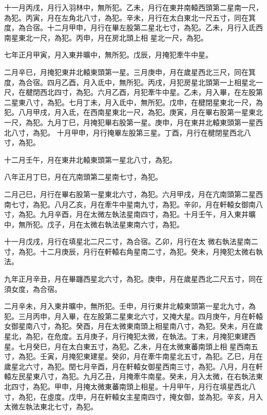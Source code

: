 \begin{pinyinscope}
 十一月丙戌，月行入羽林中，無所犯。乙未，月行在東井南轅西頭第二星南一尺，為犯。丙寅，月在左角北八寸，為犯。辛未，月行在太白東北一尺五寸，同在箕度，為合宿。十二月甲申，月行在畢左股第二星北七寸，為犯。乙未，月行入氐西南星東北一尺，為犯。丙申，月在房北頭上相
 星北一尺，為犯。



 七年正月甲寅，月入東井曠中，無所犯。戊辰，月掩犯牽牛中星。



 二月辛巳，月掩犯東井北轅東頭第一星。三月庚申，月在歲星西北三尺，同在箕度，為合宿。四月乙酉，月入氐中，無所犯。丙戌，月犯房星北頭第一上相星北一尺，在楗閉西北四寸，為犯。六月乙酉，月犯牽牛中星。乙未，月入畢，在左股第二星東八寸，為犯。七月丁未，月入氐中，無所犯。戊申，在楗閉星東北一尺，為犯。八月甲戌，月入氐，在西南星東北一尺，為犯。庚寅，月在畢右股第一星東北一尺，為犯。九月丁巳，月掩犯畢右股第一星。庚申，月在東井北轅東頭第一星西北八寸，為犯。
 十月甲申，月行掩畢左股第三星。丁酉，月行在楗閉星西北八寸，為犯。



 十二月壬午，月在東井北轅東頭第一星北八寸，為犯。



 八年正月丁巳，月在亢南頭第二星南七寸，為犯。



 二月己巳，月行在畢右股第一星東北六寸，為犯。六月甲戌，月在亢南頭第二星西南七寸，為犯。八月乙亥，月在牽牛中星南九寸，為犯。辛卯，月在軒轅女御南八寸，為犯。九月辛酉，月在太微左執法星南四寸，為犯。十月壬午，月入東井曠中，無所犯。戊子，月在太微右執法星東南六寸，為犯。



 十一月戊戌，月行在填星北二尺二寸，為合宿。乙卯，月行在太
 微右執法星南二寸，為犯。十二月庚辰，月行在軒轅右角星南二寸，為犯。癸未，月掩犯太微右執法。



 九年正月辛丑，月在畢躔西星北六寸，為犯。庚申，月在歲星西北二尺五寸，同在須女度，為合宿。



 二月辛未，月入東井曠中，無所犯。壬申，月行東井北轅東頭第一星北九寸，為犯。三月丙申，月入畢，在左股第二星東北六寸，又掩大星。四月庚午，月在軒轅女御星南八寸，為犯。癸酉，月在太微東南頭上相星南八寸，為犯。癸未，月在歲星北，為犯，在危度。五月庚子，月行掩犯太微，在執法。丁未，月掩犯東建西星。七月癸巳，月在太白東五寸，為犯。乙未，月在太微東蕃南頭上相
 星西南五寸，為犯。壬寅，月掩犯東建星。癸卯，月在牽牛南星北五寸，為犯。乙巳，月在歲星北六寸，為犯。閏七月辛酉，月在軒轅女御星西南三寸，為犯。八月，月在軒轅左民星東八寸，為犯。九月乙丑，月掩牽牛南星。癸未，月入太微，在右執法東北四寸，為犯。甲申，月掩太微東蕃南頭上相星。十月甲午，月行在填星西北八寸，為犯，在虛度。戊申，月在軒轅女主星南四寸，掩女御，並為犯。辛亥，月入太微左執法東北七寸，為犯。




\end{pinyinscope}
